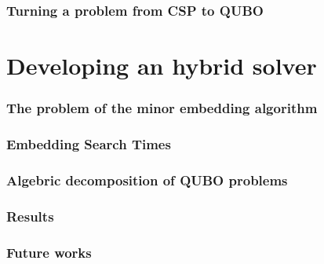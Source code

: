 \documentclass[aspectratio=169]{beamer}
\begin{document}
\begin{frame}
    \frametitle{Turning a problem from CSP to QUBO}

    

\end{frame}

\section{Developing an hybrid solver}

\begin{frame}
    \frametitle{The problem of the minor embedding algorithm}

    

\end{frame}

\begin{frame}
    \frametitle{Embedding Search Times}

    

\end{frame}

\begin{frame}
    \frametitle{Algebric decomposition of QUBO problems}

    

\end{frame}

\begin{frame}
    \frametitle{Results}

    

\end{frame}

\begin{frame}
    \frametitle{Future works}

    

\end{frame}
\end{document}

